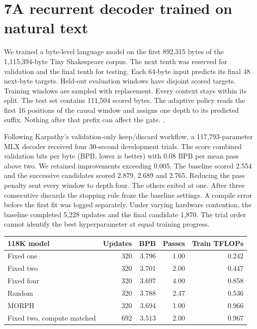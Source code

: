 \section*{7\quad A recurrent decoder trained on natural text}
We trained a byte-level language model on the first 892,315 bytes of the 1,115,394-byte Tiny Shakespeare corpus. The next tenth was reserved for validation and the final tenth for testing. Each 64-byte input predicts its final 48 next-byte targets. Held-out evaluation windows have disjoint scored targets. Training windows are sampled with replacement. Every context stays within its split. The test set contains 111,504 scored bytes. The adaptive policy reads the first 16 positions of the causal window and assigns one depth to its predicted suffix. Nothing after that prefix can affect the gate. .

 Following Karpathy's validation-only keep/discard workflow, a 117,793-parameter MLX decoder received four 30-second development trials. The score combined validation bits per byte (BPB, lower is better) with 0.08 BPB per mean pass above two. We retained improvements exceeding 0.005. The baseline scored 2.554 and the successive candidates scored 2.879, 2.689 and 2.765. Reducing the pass penalty sent every window to depth four. The others exited at one. After three consecutive discards the stopping rule froze the baseline settings. A compile error before the first fit was logged separately. Under varying hardware contention, the baseline completed 5,228 updates and the final candidate 1,870. The trial order cannot identify the best hyperparameter at equal training progress.

\begin{center}\begin{tabular}{lrrrr}\toprule
118K model & Updates & BPB & Passes & Train TFLOPs\\\midrule
Fixed one & 320 & 3.796 & 1.00 & 0.242 \\
Fixed two & 320 & 3.701 & 2.00 & 0.447 \\
Fixed four & 320 & 3.697 & 4.00 & 0.858 \\
Random & 320 & 3.788 & 2.47 & 0.536 \\
MORPH & 320 & 3.694 & 1.00 & 0.966 \\
Fixed two, compute matched & 692 & 3.513 & 2.00 & 0.967 \\
\bottomrule\end{tabular}\end{center}

